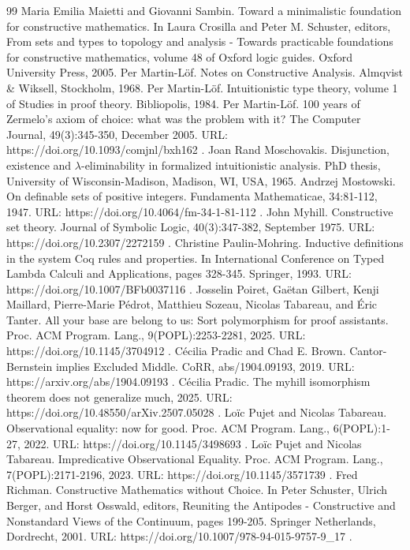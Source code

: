 \documentclass[10pt,a4paper]{amsart}
\begin{document}
\begin{thebibliography}{99}
 Maria Emilia Maietti and Giovanni Sambin. Toward a minimalistic foundation for constructive mathematics. In Laura Crosilla and Peter M. Schuster, editors, From sets and types to topology and analysis - Towards practicable foundations for constructive mathematics, volume 48 of Oxford logic guides. Oxford University Press, 2005.
 Per Martin-Löf. Notes on Constructive Analysis. Almqvist \& Wiksell, Stockholm, 1968.
 Per Martin-Löf. Intuitionistic type theory, volume 1 of Studies in proof theory. Bibliopolis, 1984.
 Per Martin-Löf. 100 years of Zermelo’s axiom of choice: what was the problem with it? The Computer Journal, 49(3):345-350, December 2005. URL: https://doi.org/10.1093/comjnl/bxh162 .
 Joan Rand Moschovakis. Disjunction, existence and \ensuremath{\lambda}-eliminability in formalized intuitionistic analysis. PhD thesis, University of Wisconsin-Madison, Madison, WI, USA, 1965.
 Andrzej Mostowski. On definable sets of positive integers. Fundamenta Mathematicae, 34:81-112, 1947. URL: https://doi.org/10.4064/fm-34-1-81-112 .
 John Myhill. Constructive set theory. Journal of Symbolic Logic, 40(3):347-382, September 1975. URL: https://doi.org/10.2307/2272159 .
 Christine Paulin-Mohring. Inductive definitions in the system Coq rules and properties. In International Conference on Typed Lambda Calculi and Applications, pages 328-345. Springer, 1993. URL: https://doi.org/10.1007/BFb0037116 .
 Josselin Poiret, Gaëtan Gilbert, Kenji Maillard, Pierre-Marie Pédrot, Matthieu Sozeau, Nicolas Tabareau, and Éric Tanter. All your base are belong to us: Sort polymorphism for proof assistants. Proc. ACM Program. Lang., 9(POPL):2253-2281, 2025. URL: https://doi.org/10.1145/3704912 .
 Cécilia Pradic and Chad E. Brown. Cantor-Bernstein implies Excluded Middle. CoRR, abs/1904.09193, 2019. URL: https://arxiv.org/abs/1904.09193 .
 Cécilia Pradic. The myhill isomorphism theorem does not generalize much, 2025. URL: https://doi.org/10.48550/arXiv.2507.05028 .
 Loïc Pujet and Nicolas Tabareau. Observational equality: now for good. Proc. ACM Program. Lang., 6(POPL):1-27, 2022. URL: https://doi.org/10.1145/3498693 .
 Loïc Pujet and Nicolas Tabareau. Impredicative Observational Equality. Proc. ACM Program. Lang., 7(POPL):2171-2196, 2023. URL: https://doi.org/10.1145/3571739 .
 Fred Richman. Constructive Mathematics without Choice. In Peter Schuster, Ulrich Berger, and Horst Osswald, editors, Reuniting the Antipodes - Constructive and Nonstandard Views of the Continuum, pages 199-205. Springer Netherlands, Dordrecht, 2001. URL: https://doi.org/10.1007/978-94-015-9757-9\_17 .

\end{thebibliography}
\end{document}
